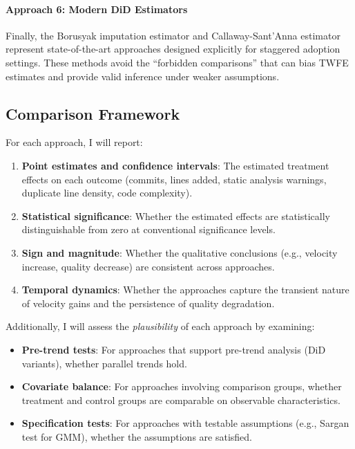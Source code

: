\paragraph{Approach 6: Modern DiD Estimators}
Finally, the Borusyak imputation estimator and Callaway-Sant'Anna estimator represent state-of-the-art approaches designed explicitly for staggered adoption settings.
These methods avoid the ``forbidden comparisons'' that can bias TWFE estimates and provide valid inference under weaker assumptions.

\subsection{Comparison Framework}

For each approach, I will report:
\begin{enumerate}[leftmargin=15pt]
    \item \textbf{Point estimates and confidence intervals}: The estimated treatment effects on each outcome (commits, lines added, static analysis warnings, duplicate line density, code complexity).
    \item \textbf{Statistical significance}: Whether the estimated effects are statistically distinguishable from zero at conventional significance levels.
    \item \textbf{Sign and magnitude}: Whether the qualitative conclusions (e.g., velocity increase, quality decrease) are consistent across approaches.
    \item \textbf{Temporal dynamics}: Whether the approaches capture the transient nature of velocity gains and the persistence of quality degradation.
\end{enumerate}

Additionally, I will assess the \emph{plausibility} of each approach by examining:
\begin{itemize}[leftmargin=15pt]
    \item \textbf{Pre-trend tests}: For approaches that support pre-trend analysis (DiD variants), whether parallel trends hold.
    \item \textbf{Covariate balance}: For approaches involving comparison groups, whether treatment and control groups are comparable on observable characteristics.
    \item \textbf{Specification tests}: For approaches with testable assumptions (e.g., Sargan test for GMM), whether the assumptions are satisfied.
\end{itemize}


